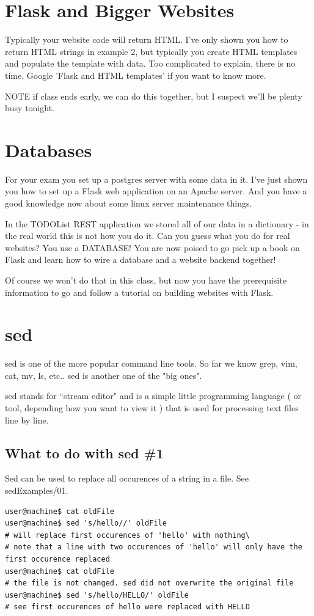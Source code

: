 \documentclass[10pt]{article}
\begin{document}
\pagebreak

\section{Flask and Bigger Websites}
Typically your website code will return HTML. I've only shown you how to return HTML strings in example 2, but typically you create HTML templates and populate the template with data. Too complicated to explain, there is no time. Google 'Flask and HTML templates' if you want to know more.

NOTE if class ends early, we can do this together, but I suspect we'll be plenty busy tonight.

\section{Databases}
For your exam you set up a postgres server with some data in it. I've just shown you how to set up a Flask web application on an Apache server. And you have a good knowledge now about some linux server maintenance things. 

In the TODOList REST application we stored all of our data in a dictionary - in the real world this is not how you do it. Can you guess what you do for real websites? You use a DATABASE! You are now poised to go pick up a book on Flask and learn how to wire a database and a website backend together!

Of course we won't do that in this class, but now you have the prerequisite information to go and follow a tutorial on building websites with Flask.

\section{sed}
sed is one of the more popular command line tools. So far we know grep, vim, cat, mv, ls, etc.. sed is another one of the "big ones".

sed stands for ``stream editor" and is a simple little programming language ( or tool, depending how you want to view it ) that is used for processing text files line by line.

\subsection{What to do with sed \#1}
Sed can be used to replace all occurences of a string in a file.
See sedExamples/01.

\begin{lstlisting}
user@machine$ cat oldFile
user@machine$ sed 's/hello//' oldFile
# will replace first occurences of 'hello' with nothing\
# note that a line with two occurences of 'hello' will only have the first occurence replaced
user@machine$ cat oldFile
# the file is not changed. sed did not overwrite the original file
user@machine$ sed 's/hello/HELLO/' oldFile
# see first occurences of hello were replaced with HELLO
\end{lstlisting}
\end{document}
